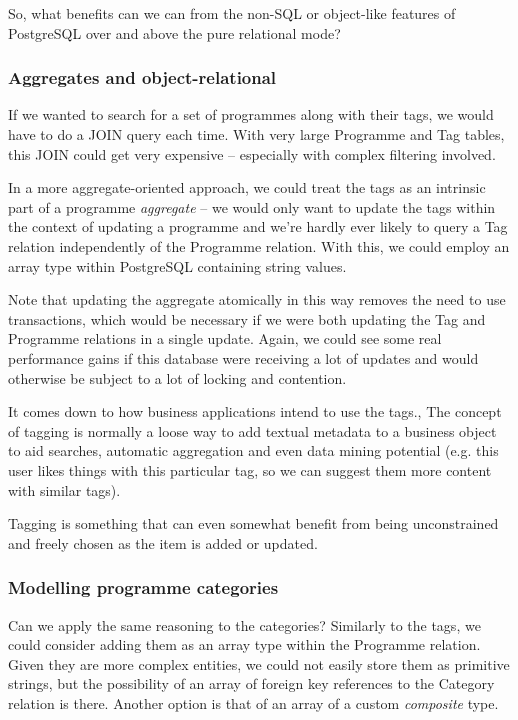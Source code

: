\documentclass[11pt,a4paper]{article}
\begin{document}
So, what benefits can we can from the non-SQL or object-like features of
PostgreSQL over and above the pure relational mode?

\subsubsection{Aggregates and object-relational}

If we wanted to search for a set of programmes along with their tags, we would
have to do a JOIN query each time. With very large Programme and Tag tables, this
JOIN could get very expensive -- especially with complex filtering involved.

In a more aggregate-oriented approach, we could treat the tags as an
intrinsic part of a programme \emph{aggregate} -- we would only want to update
the tags within the context of updating a programme and we're hardly
ever likely to query a Tag relation independently of the Programme relation.
With this, we could employ an array type within PostgreSQL  containing string
values.

Note that updating the aggregate atomically in this way removes the need
to use transactions, which would be necessary if we were both updating the
Tag and Programme relations in a single update. Again, we could see some
real performance gains if this database were receiving a lot of updates and
would otherwise be subject to a lot of locking and contention. \cite{sadalage2012nosql}

It comes down to how business applications intend to use the tags.,
The concept of tagging is normally a loose way to add textual metadata to a
business object to aid searches, automatic aggregation and even data
mining potential (e.g. this user likes things with this particular tag,
so we can suggest them more content with similar tags).

Tagging is something that can even somewhat benefit from being unconstrained
and freely chosen as the item is added or updated. \cite{smith2008tagging}

\subsubsection{Modelling programme categories}

Can we apply the same reasoning to the categories? Similarly to the
tags, we could consider adding them as an array type within the
Programme relation. Given they are more complex entities, we could
not easily store them as primitive strings, but the possibility of an
array of foreign key references to the Category relation is there. Another
option is that of an array of a custom \emph{composite} type.
\end{document}
